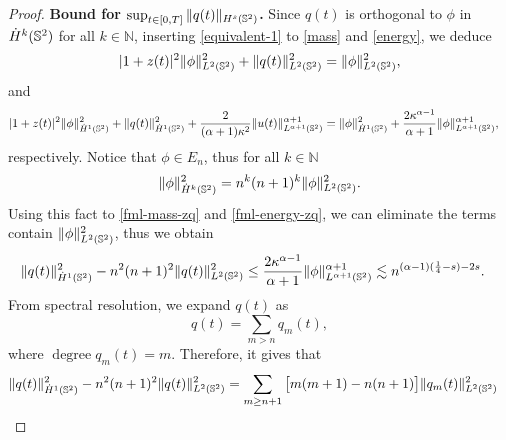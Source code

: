 \documentclass[11pt, reqno]{amsart}
\numberwithin{equation}{section}
\newcommand{\N}{\mathbb N}
\theoremstyle{definition}
\theoremstyle{remark}
\begin{document}
{\begin{proof}
\textbf{Bound for $\sup_{t\in[0,T]}\|q(t)\|_{H^s(\Bbb S^2)}$.} Since $q(t)$ is orthogonal to $\phi$ in $\dot{H}^k(\Bbb S^2)$ for all $k\in\N$, inserting \eqref{equivalent-1} to  \eqref{mass} and \eqref{energy},  we deduce
\begin{equation}\label{fml-mass-zq}
|1+z(t)|^2\|\phi\|^2_{L^2(\Bbb S^2)}+\|q(t)\|^2_{L^2(\Bbb S^2)} = \|\phi\|^2_{L^2(\Bbb S^2)},  
\end{equation} 
and
\begin{equation}\label{fml-energy-zq}
\begin{aligned}
&|1+z(t)|^2\|\phi\|^2_{\dot{H}^1(\Bbb S^2)} + \|q(t)\|^2_{\dot{H}^1(\Bbb S^2)}+ \frac{2}{(\alpha+1)\kappa^2}\|u(t)\|^{\alpha+1}_{L^{\alpha+1}(\Bbb S^2)}= \|\phi\|^2_{\dot{H}^1(\Bbb S^2)}+\frac{2\kappa^{\alpha-1}}{\alpha+1}\|\phi\|^{\alpha+1}_{L^{\alpha+1}(\Bbb S^2)},
\end{aligned}
\end{equation}
respectively. Notice that $\phi\in E_n$, thus for all $k\in\N$
\begin{equation*}
\|\phi\|^2_{\dot{H}^k(\Bbb S^2)} = n^k(n+1)^k\|\phi\|^2_{L^2(\Bbb S^2)}.
\end{equation*}
Using this fact to \eqref{fml-mass-zq} and \eqref{fml-energy-zq}, we can eliminate the terms contain $\|\phi\|^2_{L^2(\Bbb S^2)}$, thus we obtain
\begin{equation*}
\begin{aligned}
\|q(t)\|^2_{\dot{H}^1(\Bbb S^2)}-n^2(n+1)^2\|q(t)\|^2_{L^2(\Bbb S^2)} &\le \frac{2\kappa^{\alpha-1}}{\alpha+1}\|\phi\|^{\alpha+1}_{L^{\alpha+1}(\Bbb S^2)}\lesssim n^{(\alpha-1)(\frac{1}{4}-s)-2s}.
\end{aligned}
\end{equation*}
From spectral resolution, we expand $q(t)$ as
\begin{equation*}
q(t) = \sum_{m>n} q_m(t),
\end{equation*}
where $\operatorname{degree}q_m(t) = m$. Therefore, it gives that
\begin{align*}
&\|q(t)\|^2_{\dot{H}^1(\Bbb S^2)}-n^2(n+1)^2\|q(t)\|^2_{L^2(\Bbb S^2)}=\sum_{m\ge n+1}\big[ m(m+1)-n(n+1) \big]\|q_m(t)\|^2_{L^2(\Bbb S^2)}
\end{align*}
		

\end{proof}}
\end{document}
